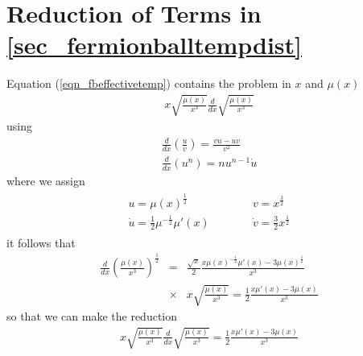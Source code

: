 \section{Reduction of Terms in \ref{sec_fermionballtempdist}}
\label{app_solnoffermiontempdist}
Equation (\ref{eqn_fbeffectivetemp}) contains the problem in $x$ and $\mu(x)$
\begin{eqnarray*}
	x\sqrt{\frac{\mu(x)}{x^3}}\frac{d}{dx}\sqrt{\frac{\mu(x)}{x^3}}
\end{eqnarray*}
using
\begin{eqnarray*}
	\frac{d}{dx}\left(\frac{u}{v}\right) = \frac{v\dot{u}-u\dot{v}}{v^2} \\
	\frac{d}{dx}\left(u^n\right) = nu^{n-1}\dot{u}
\end{eqnarray*}
where we assign
\begin{eqnarray*}
	\begin{array}{ll}
	u=\mu(x)^{\frac{1}{2}} & v=x^{\frac{3}{2}} \\
	\dot{u}=\frac{1}{2}\mu^{-\frac{1}{2}}\mu '(x)\qquad\quad & \dot{v}=\frac{3}{2}x^{\frac{1}{2}} 
	\end{array}
\end{eqnarray*}
it follows that
\begin{eqnarray*}
	\frac{d}{dx}\left(\frac{\mu(x)}{x^3}\right)^{\frac{1}{2}}
	&=&\frac{\sqrt{x}}{2}\frac{x\mu(x)^{-\frac{1}{2}}\mu '(x)-3\mu(x)^{\frac{1}{2}}}{x^3} \\
	&\times& x\sqrt{\frac{\mu(x)}{x^3}} = \frac{1}{2}\frac{x\mu '(x)-3\mu(x)}{x^3}
\end{eqnarray*}
so that we can make the reduction
\begin{eqnarray*}
	x\sqrt{\frac{\mu(x)}{x^3}}\frac{d}{dx}\sqrt{\frac{\mu(x)}{x^3}} = \frac{1}{2}\frac{x\mu '(x)-3\mu(x)}{x^3}
\end{eqnarray*}
